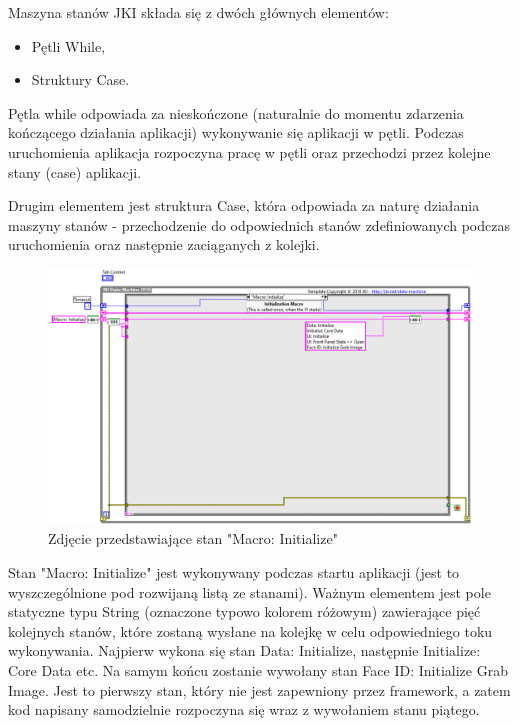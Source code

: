 \documentclass{report}
\begin{document}
Maszyna stanów JKI składa się z dwóch głównych elementów:
\begin{itemize}
    \item Pętli While,
    \item Struktury Case.
\end{itemize}

Pętla while odpowiada za nieskończone (naturalnie do momentu zdarzenia kończącego działania aplikacji) wykonywanie się aplikacji w pętli.
Podczas uruchomienia aplikacja rozpoczyna pracę w pętli oraz przechodzi przez kolejne stany (case) aplikacji.

Drugim elementem jest struktura Case, która odpowiada za naturę działania maszyny stanów - przechodzenie do odpowiednich stanów zdefiniowanych podczas uruchomienia oraz następnie zaciąganych z kolejki. 

\begin{figure} [H]
    \centering
    \includegraphics[width=1.0\textwidth]{"src/macro-init.png"}
    \caption{Zdjęcie przedstawiające stan "Macro: Initialize"}
    \label{fig:foto2}
\end{figure}

Stan "Macro: Initialize" jest wykonywany podczas startu aplikacji (jest to wyszczególnione pod rozwijaną listą ze stanami). Ważnym elementem jest pole statyczne typu String (oznaczone typowo kolorem różowym) 
zawierające pięć kolejnych stanów, które zostaną wysłane na kolejkę w celu odpowiedniego toku wykonywania. Najpierw wykona się stan Data: Initialize, następnie Initialize: Core Data etc. 
Na samym końcu zostanie wywołany stan Face ID: Initialize Grab Image. Jest to pierwszy stan, który nie jest zapewniony przez framework, a zatem kod napisany samodzielnie rozpoczyna się wraz z wywołaniem stanu piątego. 
\end{document}
